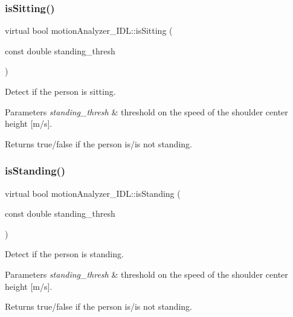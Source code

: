 \subsubsection{\texorpdfstring{isSitting()}{isSitting()}}
{\footnotesize\ttfamily virtual bool motion\+Analyzer\+\_\+\+I\+D\+L\+::is\+Sitting (\begin{DoxyParamCaption}\item[{const double}]{standing\+\_\+thresh }\end{DoxyParamCaption})\hspace{0.3cm}{\ttfamily [virtual]}}



Detect if the person is sitting. 


\begin{DoxyParams}{Parameters}
{\em standing\+\_\+thresh} & threshold on the speed of the shoulder center height \mbox{[}m/s\mbox{]}. \\
\hline
\end{DoxyParams}
\begin{DoxyReturn}{Returns}
true/false if the person is/is not standing. 
\end{DoxyReturn}
\mbox{\label{classmotionAnalyzer__IDL_a12bec8ae19daddd4b01d06bb5453e303}} 
\subsubsection{\texorpdfstring{isStanding()}{isStanding()}}
{\footnotesize\ttfamily virtual bool motion\+Analyzer\+\_\+\+I\+D\+L\+::is\+Standing (\begin{DoxyParamCaption}\item[{const double}]{standing\+\_\+thresh }\end{DoxyParamCaption})\hspace{0.3cm}{\ttfamily [virtual]}}



Detect if the person is standing. 


\begin{DoxyParams}{Parameters}
{\em standing\+\_\+thresh} & threshold on the speed of the shoulder center height \mbox{[}m/s\mbox{]}. \\
\hline
\end{DoxyParams}
\begin{DoxyReturn}{Returns}
true/false if the person is/is not standing. 
\end{DoxyReturn}
\mbox{\label{classmotionAnalyzer__IDL_ac62e7b2af278d353c3701d87aca8af2b}} 
